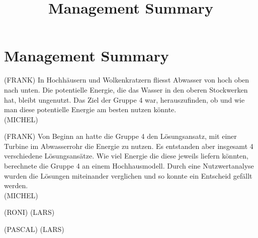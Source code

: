 \documentclass[12pt]{article}
\title{Management Summary}
\begin{document}
\section*{Management Summary}
(FRANK) In Hochhäusern und Wolkenkratzern fliesst Abwasser von hoch oben nach unten. Die potentielle Energie, die das Wasser in den oberen Stockwerken hat, bleibt ungenutzt. Das Ziel der Gruppe 4 war, herauszufinden, ob und wie man diese potentielle Energie am besten nutzen könnte.\\
(MICHEL)


(FRANK) Von Beginn an hatte die Gruppe 4 den Lösungsansatz, mit einer Turbine im Abwasserrohr die Energie zu nutzen. Es entstanden aber insgesamt 4 verschiedene Lösungsansätze. Wie viel Energie die diese jeweils liefern könnten, berechnete die Gruppe 4 an einem Hochhausmodell. Durch eine Nutzwertanalyse wurden die Lösungen miteinander verglichen und so konnte ein Entscheid gefällt werden.\\
(MICHEL)


(RONI)
(LARS)

(PASCAL)
(LARS)
\end{document}
